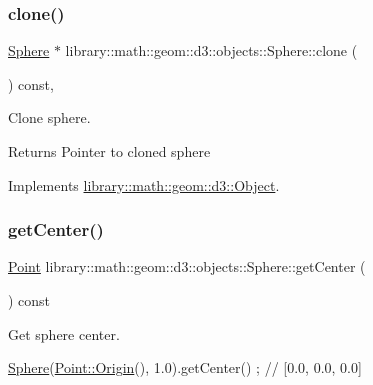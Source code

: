 \subsubsection{\texorpdfstring{clone()}{clone()}}
{\footnotesize\ttfamily \hyperlink{classlibrary_1_1math_1_1geom_1_1d3_1_1objects_1_1_sphere}{Sphere} $\ast$ library\+::math\+::geom\+::d3\+::objects\+::\+Sphere\+::clone (\begin{DoxyParamCaption}{ }\end{DoxyParamCaption}) const\hspace{0.3cm}{\ttfamily [override]}, {\ttfamily [virtual]}}



Clone sphere. 

\begin{DoxyReturn}{Returns}
Pointer to cloned sphere 
\end{DoxyReturn}


Implements \hyperlink{classlibrary_1_1math_1_1geom_1_1d3_1_1_object_a1a784c6b359e0eb97cd34fabc42f2f3f}{library\+::math\+::geom\+::d3\+::\+Object}.

\mbox{\label{classlibrary_1_1math_1_1geom_1_1d3_1_1objects_1_1_sphere_a871367ab75aa46194a6b8ddc8a45967f}} 
\subsubsection{\texorpdfstring{get\+Center()}{getCenter()}}
{\footnotesize\ttfamily \hyperlink{classlibrary_1_1math_1_1geom_1_1d3_1_1objects_1_1_point}{Point} library\+::math\+::geom\+::d3\+::objects\+::\+Sphere\+::get\+Center (\begin{DoxyParamCaption}{ }\end{DoxyParamCaption}) const}



Get sphere center. 


\begin{DoxyCode}
\hyperlink{classlibrary_1_1math_1_1geom_1_1d3_1_1objects_1_1_sphere_a55dccc8ea16ee55cd7694c26afa8ea39}{Sphere}(\hyperlink{classlibrary_1_1math_1_1geom_1_1d3_1_1objects_1_1_point_ab2a38e285c562e50bf350272c083986f}{Point::Origin}(), 1.0).getCenter() ; \textcolor{comment}{// [0.0, 0.0, 0.0]}
\end{DoxyCode}



